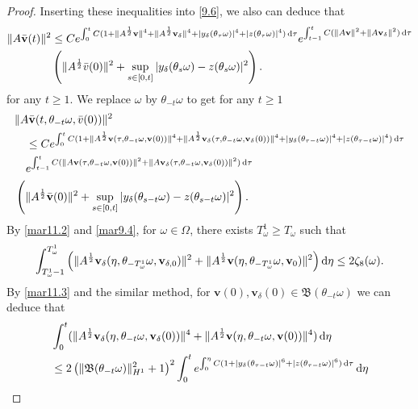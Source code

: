 \documentclass{elsarticle}
\theoremstyle{definition}
\numberwithin{equation}{section}
\renewcommand{\d}{{\rm{d}}}
\begin{document}
\begin{proof}
Inserting these inequalities  into \eqref{9.6}, we also can deduce that
\begin{align}
 \|A\bar{\textbf{v}}(t)\|^2
&\leq Ce^{\int_0^tC( 1+\|A^\frac12\textbf{v}\|^4+\|A^\frac12\textbf{v}_\delta\|^4+|y_\delta(\theta_\tau\omega)|^4+|z(\theta_\tau\omega)|^4)\, \d \tau}e^{\int_{t-1}^tC( \|A\textbf{v}\|^2+\|A\textbf{v}_\delta\|^2)\, \d \tau}\nonumber\\
&\left(\|A^\frac12\bar{v}(0)\|^2 + \sup\limits_{s\in[0,t]}|y_\delta(\theta_s\omega)-z(\theta_s\omega)|^2\right).
\end{align}
for any $t\geq 1$.
We replace $\omega$ by $\theta_{-t}\omega$ to  get  for any $ t\geq 1$
\begin{align}\label{9.7}
& \|A\bar{\textbf{v}}(t,\theta_{-t}\omega,\bar{v}(0))\|^2\nonumber\\
&\quad \leq Ce^{\int_0^tC( 1+\|A^\frac12\textbf{v}(\tau,\theta_{-t}\omega,\textbf{v}(0))\|^4
+\|A^\frac12\textbf{v}_\delta(\tau,\theta_{-t}\omega,\textbf{v}_\delta(0))\|^4
+|y_\delta(\theta_{\tau-t}\omega)|^4+|z(\theta_{\tau-t}\omega)|^4)\, \d \tau}\nonumber\\
&\quad e^{\int_{t-1}^tC( \|A\textbf{v}(\tau,\theta_{-t}\omega,\textbf{v}(0))\|^2+\|A\textbf{v}_\delta(\tau,\theta_{-t}\omega,\textbf{v}_\delta(0))
\|^2)\, \d \tau} \nonumber\\
&\left(\|A^\frac12\bar{\textbf{v}}(0)\|^2+ \sup\limits_{s\in[0,t]}|y_\delta(\theta_{s-t}\omega)-z(\theta_{s-t}\omega)|^2\right).
\end{align}
By \eqref{mar11.2} and \eqref{mar9.4}, for $\omega\in \Omega$, there exists $T_\omega^1 \geq T_\omega$
such that
\begin{align}\label{9.8}
  \int_{T_\omega^1 -1}^{T_\omega^1 }  \left ( \|A^\frac12\textbf{v}_\delta(\eta,\theta_{-T_\omega^1 }\omega,\textbf{v}_{\delta,0})\|^2+\|A^\frac12\textbf{v}(\eta,\theta_{-T_\omega^1 }\omega,\textbf{v}_{0})\|^2\right)  \d \eta
 \leq  2\zeta_8(\omega) .
 \end{align}
By \eqref{mar11.3} and the similar method, for   $\textbf{v}(0), \textbf{v}_\delta(0)\in \mathfrak B(\theta_{-t}\omega)$ we can deduce that
 \begin{align*}
 &\int_0^t
 (\|A^{\frac 12} \textbf{v}_\delta(\eta, \theta_{-t} \omega, \textbf{v}_\delta(0))\|^4+\|A^{\frac 12} \textbf{v}(\eta, \theta_{-t} \omega, \textbf{v}(0))\|^4) \, \d \eta\nonumber\\
 &   \leq  2\left( \| \mathfrak B  (\theta_{-t}\omega)\|^2_{H^1} +1 \right)^2 \int_0^t e^{ \int^\eta_0 C(1+|y_\delta(\theta_{\tau-t} \omega)|^6+|z(\theta_{\tau-t} \omega)|^6) \, \d \tau}  \, \d \eta \nonumber \\

\end{align*}
\end{proof}
\end{document}
